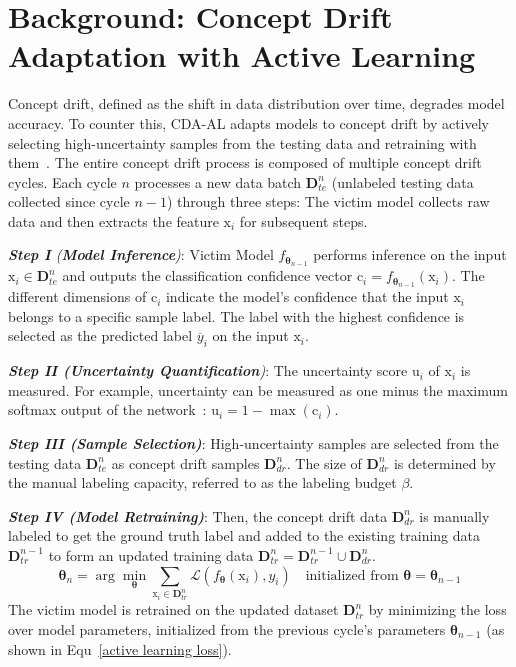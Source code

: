 \documentclass[lettersize,journal]{IEEEtran}
\begin{document}
\section{Background: Concept Drift Adaptation with Active Learning}
\label{Sec: Concept Drift Adaptation}
Concept drift, defined as the shift in data distribution over time, degrades model accuracy.
To counter this, CDA-AL adapts models to concept drift by actively selecting high-uncertainty samples from the testing data and retraining with them~\cite{2023-Usenix-chenyizhen,park2016active,vzliobaite2013active}.
The entire concept drift process is composed of multiple concept drift cycles.
Each cycle $n$ processes a new data batch $\bm{D}_{te}^{n}$ (unlabeled testing data collected since cycle $n-1$) through three steps:
The victim model collects raw data and then extracts the feature $\bm{\mathrm{x}}_{i}$ for subsequent steps.

\emph{\textbf{Step I} (\textbf{Model Inference})}: Victim Model $f_{\bm{\theta}_{n-1}}$ performs inference on the input $\bm{\mathrm{x}}_{i} \in \bm{D}_{te}^{n}$ and outputs the classification confidence vector $\bm{\mathrm{c}}_{i} = f_{\bm{\theta}_{n-1}} \left( \bm{\mathrm{x}}_{i} \right)$.
	The different dimensions of $\bm{\mathrm{c}}_{i}$ indicate the model's confidence that the input $\bm{\mathrm{x}}_{i}$ belongs to a specific sample label.
	The label with the highest confidence is selected as the predicted label $\overline{y}_{i}$ on the input $\bm{\mathrm{x}}_{i}$.

\emph{\textbf{Step II (Uncertainty Quantification})}: The uncertainty score $\bm{\mathrm{u}}_{i}$ of $\bm{\mathrm{x}}_{i}$ is measured.
For example, uncertainty can be measured as one minus the maximum softmax output of the network~\cite{2023-Usenix-chenyizhen}:
$\bm{\mathrm{u}}_{i} = 1-\max(\bm{\mathrm{c}}_{i})$.

\emph{\textbf{Step III (Sample Selection)}}: High-uncertainty samples are selected from the testing data $\bm{D}_{te}^{n}$ as concept drift samples $\bm{D}_{dr}^{n}$.
	The size of $\bm{D}_{dr}^{n}$ is determined by the manual labeling capacity, referred to as the labeling budget $\beta$.
	
\emph{\textbf{Step IV (Model Retraining)}}: 
	Then, the concept drift data $\bm{D}_{dr}^{n}$ is manually labeled to get the ground truth label and added to the existing training data $\bm{D}^{n-1}_{tr}$ to form an updated training data $\bm{D}^{n}_{tr} = \bm{D}_{tr}^{n-1} \cup \bm{D}_{dr}^{n}$.
	\begin{equation}
		\bm{\theta}_{n} = \arg\min_{\bm{\theta}} \sum_{\bm{\mathrm{x}}_{i} \in \bm{D}^{n}_{tr}} \mathcal{L} \left( f_{\bm{\theta}}(\bm{\mathrm{x}}_{i}), y_{i} \right) 
		\quad \text{initialized from } \bm{\theta} = \bm{\theta}_{n-1}
		\label{active learning loss}
	\end{equation}
	The victim model is retrained on the updated dataset $\bm{D}^{n}_{tr}$ by minimizing the loss over model parameters, initialized from the previous cycle's parameters $\bm{\theta}_{n-1}$ (as shown in Equ~\ref{active learning loss}).
\end{document}
